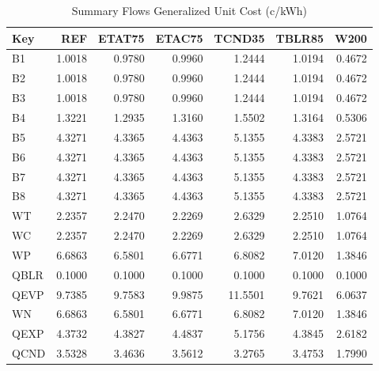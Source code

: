 \begin{table}[H]
\caption{Summary Flows Generalized Unit Cost (c/kWh)}
\label{tab:gfuc}
	\begin{tabular}{lrrrrrr}
		\toprule
		Key    &        REF &     ETAT75 &     ETAC75 &     TCND35 &     TBLR85 &       W200\\
		\midrule
		B1     &     1.0018 &     0.9780 &     0.9960 &     1.2444 &     1.0194 &     0.4672\\
		B2     &     1.0018 &     0.9780 &     0.9960 &     1.2444 &     1.0194 &     0.4672\\
		B3     &     1.0018 &     0.9780 &     0.9960 &     1.2444 &     1.0194 &     0.4672\\
		B4     &     1.3221 &     1.2935 &     1.3160 &     1.5502 &     1.3164 &     0.5306\\
		B5     &     4.3271 &     4.3365 &     4.4363 &     5.1355 &     4.3383 &     2.5721\\
		B6     &     4.3271 &     4.3365 &     4.4363 &     5.1355 &     4.3383 &     2.5721\\
		B7     &     4.3271 &     4.3365 &     4.4363 &     5.1355 &     4.3383 &     2.5721\\
		B8     &     4.3271 &     4.3365 &     4.4363 &     5.1355 &     4.3383 &     2.5721\\
		WT     &     2.2357 &     2.2470 &     2.2269 &     2.6329 &     2.2510 &     1.0764\\
		WC     &     2.2357 &     2.2470 &     2.2269 &     2.6329 &     2.2510 &     1.0764\\
		WP     &     6.6863 &     6.5801 &     6.6771 &     6.8082 &     7.0120 &     1.3846\\
		QBLR   &     0.1000 &     0.1000 &     0.1000 &     0.1000 &     0.1000 &     0.1000\\
		QEVP   &     9.7385 &     9.7583 &     9.9875 &    11.5501 &     9.7621 &     6.0637\\
		WN     &     6.6863 &     6.5801 &     6.6771 &     6.8082 &     7.0120 &     1.3846\\
		QEXP   &     4.3732 &     4.3827 &     4.4837 &     5.1756 &     4.3845 &     2.6182\\
		QCND   &     3.5328 &     3.4636 &     3.5612 &     3.2765 &     3.4753 &     1.7990\\
		\bottomrule
	\end{tabular}
\end{table}

